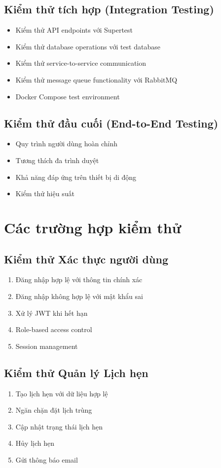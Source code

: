 \documentclass[12pt,a4paper]{report}
\begin{document}
    \subsection{Kiểm thử tích hợp (Integration Testing)}
    \begin{itemize}
        \item Kiểm thử API endpoints với Supertest
        \item Kiểm thử database operations với test database
        \item Kiểm thử service-to-service communication
        \item Kiểm thử message queue functionality với RabbitMQ
        \item Docker Compose test environment
    \end{itemize}

    \subsection{Kiểm thử đầu cuối (End-to-End Testing)}
    \begin{itemize}
        \item Quy trình người dùng hoàn chỉnh
        \item Tương thích đa trình duyệt
        \item Khả năng đáp ứng trên thiết bị di động
        \item Kiểm thử hiệu suất
    \end{itemize}

    \section{Các trường hợp kiểm thử}

    \subsection{Kiểm thử Xác thực người dùng}
    \begin{enumerate}
        \item Đăng nhập hợp lệ với thông tin chính xác
        \item Đăng nhập không hợp lệ với mật khẩu sai
        \item Xử lý JWT khi hết hạn
        \item Role-based access control
        \item Session management
    \end{enumerate}

    \subsection{Kiểm thử Quản lý Lịch hẹn}
    \begin{enumerate}
        \item Tạo lịch hẹn với dữ liệu hợp lệ
        \item Ngăn chặn đặt lịch trùng
        \item Cập nhật trạng thái lịch hẹn
        \item Hủy lịch hẹn
        \item Gửi thông báo email
    \end{enumerate}
\end{document}
